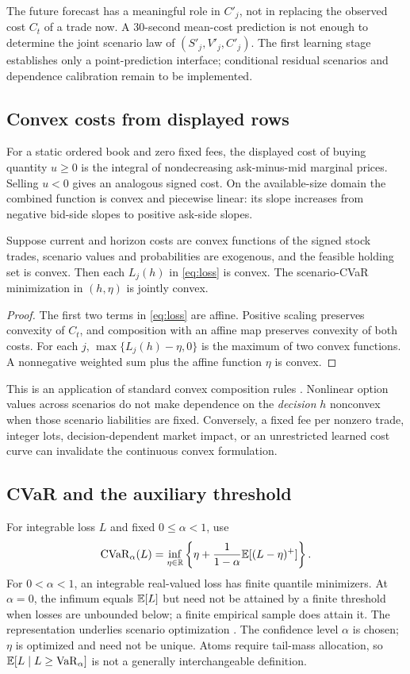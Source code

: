 The future forecast has a meaningful role in $C'_j$, not in replacing the observed cost $C_t$ of a trade now. A 30-second mean-cost prediction is not enough to determine the joint scenario law of $(S'_j,V'_j,C'_j)$. The first learning stage establishes only a point-prediction interface; conditional residual scenarios and dependence calibration remain to be implemented.

\subsection{Convex costs from displayed rows}
For a static ordered book and zero fixed fees, the displayed cost of buying quantity $u\geq0$ is the integral of nondecreasing ask-minus-mid marginal prices. Selling $u<0$ gives an analogous signed cost. On the available-size domain the combined function is convex and piecewise linear: its slope increases from negative bid-side slopes to positive ask-side slopes.

\begin{proposition}
Suppose current and horizon costs are convex functions of the signed stock trades, scenario values and probabilities are exogenous, and the feasible holding set is convex. Then each $L_j(h)$ in \eqref{eq:loss} is convex. The scenario-CVaR minimization in $(h,\eta)$ is jointly convex.
\end{proposition}
\begin{proof}
The first two terms in \eqref{eq:loss} are affine. Positive scaling preserves convexity of $C_t$, and composition with an affine map preserves convexity of both costs. For each $j$, $\max\{L_j(h)-\eta,0\}$ is the maximum of two convex functions. A nonnegative weighted sum plus the affine function $\eta$ is convex.
\end{proof}
This is an application of standard convex composition rules \citep{boyd2004}. Nonlinear option values across scenarios do not make dependence on the \emph{decision} $h$ nonconvex when those scenario liabilities are fixed. Conversely, a fixed fee per nonzero trade, integer lots, decision-dependent market impact, or an unrestricted learned cost curve can invalidate the continuous convex formulation.

\subsection{CVaR and the auxiliary threshold}
For integrable loss $L$ and fixed $0\leq\alpha<1$, use
\begin{equation}
 \operatorname{CVaR}_\alpha(L)=\inf_{\eta\in\mathbb R}
 \left\{\eta+\frac{1}{1-\alpha}\mathbb E[(L-\eta)^+]\right\}.\label{eq:cvar}
\end{equation}
For $0<\alpha<1$, an integrable real-valued loss has finite quantile minimizers. At $\alpha=0$, the infimum equals $\mathbb E[L]$ but need not be attained by a finite threshold when losses are unbounded below; a finite empirical sample does attain it. The representation underlies scenario optimization \citep{rockafellar2000}. The confidence level $\alpha$ is chosen; $\eta$ is optimized and need not be unique. Atoms require tail-mass allocation, so $\mathbb E[L\mid L\geq\operatorname{VaR}_\alpha]$ is not a generally interchangeable definition.

